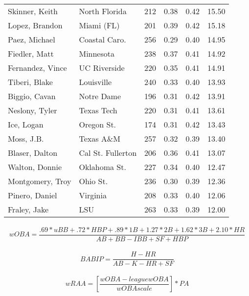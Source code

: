 \documentclass[12pt]{article}
\begin{document}
\begin{landscape}
\begin{table}[H]
\begin{minipage}{.4\textwidth}
{\begin{tabular}{llrrrr}
			Skinner, Keith & North Florida & 212 & 0.38 & 0.42 & 15.50 \\ 
			Lopez, Brandon & Miami (FL) & 201 & 0.39 & 0.42 & 15.18 \\ 
			Paez, Michael & Coastal Caro. & 256 & 0.29 & 0.40 & 14.95 \\ 
			Fiedler, Matt & Minnesota & 238 & 0.37 & 0.41 & 14.92 \\ 
			Fernandez, Vince & UC Riverside & 220 & 0.35 & 0.41 & 14.91 \\ 
			Tiberi, Blake & Louisville & 240 & 0.33 & 0.40 & 13.93 \\ 
			Biggio, Cavan & Notre Dame & 196 & 0.31 & 0.42 & 13.91 \\ 
			Neslony, Tyler & Texas Tech & 220 & 0.31 & 0.41 & 13.61 \\ 
			Ice, Logan & Oregon St. & 174 & 0.31 & 0.42 & 13.43 \\ 
			Moss, J.B. & Texas A\&M & 257 & 0.32 & 0.39 & 13.40 \\ 
			Blaser, Dalton & Cal St. Fullerton & 206 & 0.36 & 0.41 & 13.07 \\ 
			Walton, Donnie & Oklahoma St. & 227 & 0.34 & 0.40 & 12.47 \\ 
			Montgomery, Troy & Ohio St. & 236 & 0.30 & 0.39 & 12.36 \\ 
			Pinero, Daniel & Virginia & 208 & 0.33 & 0.40 & 12.06 \\ 
			Fraley, Jake & LSU & 263 & 0.33 & 0.39 & 12.00 \\ 
			\hline
		\end{tabular}}
	\end{minipage}
\end{table}

\end{landscape}	




\begin{align*}
	wOBA = \dfrac{.69 * uBB + .72 * HBP + .89 * 1B + 1.27 * 2B + 1.62 * 3B + 2.10 * HR}{AB + BB - IBB + SF + HBP}
\end{align*}

\begin{align*}
	BABIP = \dfrac{H - HR}{AB - K - HR + SF}
\end{align*}

\begin{align*}
	wRAA = [\dfrac{wOBA - league wOBA}{wOBA scale}] * PA
\end{align*}
		
\end{document}
